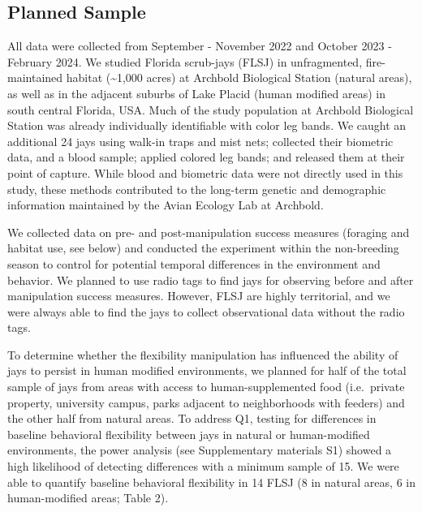 \documentclass[
]{article}
\begin{document}
\subsection{Planned Sample}\label{planned-sample}

All data were collected from September - November 2022 and October 2023
- February 2024. We studied Florida scrub-jays (FLSJ) in unfragmented,
fire-maintained habitat (\textasciitilde1,000 acres) at Archbold
Biological Station (natural areas), as well as in the adjacent suburbs
of Lake Placid (human modified areas) in south central Florida, USA.
Much of the study population at Archbold Biological Station was already
individually identifiable with color leg bands. We caught an additional
24 jays using walk-in traps and mist nets; collected their biometric
data, and a blood sample; applied colored leg bands; and released them
at their point of capture. While blood and biometric data were not
directly used in this study, these methods contributed to the long-term
genetic and demographic information maintained by the Avian Ecology Lab
at Archbold.

We collected data on pre- and post-manipulation success measures
(foraging and habitat use, see below) and conducted the experiment
within the non-breeding season to control for potential temporal
differences in the environment and behavior. We planned to use radio
tags to find jays for observing before and after manipulation success
measures. However, FLSJ are highly territorial, and we were always able
to find the jays to collect observational data without the radio tags.

To determine whether the flexibility manipulation has influenced the
ability of jays to persist in human modified environments, we planned
for half of the total sample of jays from areas with access to
human-supplemented food (i.e.~private property, university campus, parks
adjacent to neighborhoods with feeders) and the other half from natural
areas. To address Q1, testing for differences in baseline behavioral
flexibility between jays in natural or human-modified environments, the
power analysis (see Supplementary materials S1) showed a high likelihood
of detecting differences with a minimum sample of 15. We were able to
quantify baseline behavioral flexibility in 14 FLSJ (8 in natural areas,
6 in human-modified areas; Table 2).
\end{document}
